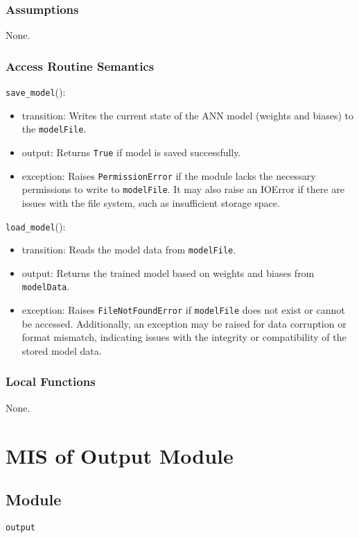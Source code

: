 \documentclass[12pt, titlepage]{article}
\def\code#1{\texttt{#1}}
\begin{document}
\subsubsection{Assumptions}
None.

\subsubsection{Access Routine Semantics}

\noindent \code{save\_model}():
\begin{itemize}
  \item transition: Writes the current state of the ANN model (weights and biases) to the \code{modelFile}.
  \item output: Returns \code{True} if model is saved successfully.
  \item exception: Raises \code{PermissionError} if the module lacks the necessary permissions to write to \code{modelFile}. 
  It may also raise an IOError if there are issues with the file system, such as insufficient storage space.
\end{itemize}

\noindent \code{load\_model}():
\begin{itemize}
  \item transition: Reads the model data from \code{modelFile}. 
  \item output: Returns the trained model based on weights and biases from \code{modelData}.
  \item exception: Raises \code{FileNotFoundError} if \code{modelFile} does not exist or cannot be accessed. 
  Additionally, an exception may be raised for data corruption or format mismatch, indicating issues 
  with the integrity or compatibility of the stored model data.
\end{itemize}


\subsubsection{Local Functions}
None.

\section{MIS of Output Module} \label{Output} 

\subsection{Module}
\code{output} 
\end{document}
